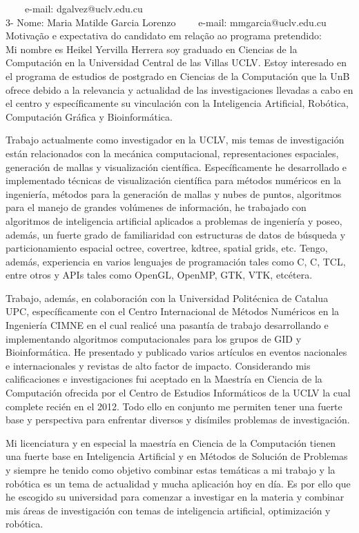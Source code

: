 \documentclass[11pt]{article}
\begin{document}
\ \ \ \ e-mail: dgalvez@uclv.edu.cu
\\
3- Nome: Maria Matilde Garcia Lorenzo
\ \ \ \ e-mail: mmgarcia@uclv.edu.cu
\\[0.2cm]
Motivação e expectativa do candidato em relação ao programa pretendido:
\\Mi nombre es Heikel Yervilla Herrera soy graduado en Ciencias de la Computación en la Universidad Central de las Villas UCLV. Estoy interesado en el programa de estudios de postgrado en Ciencias de la Computación que la UnB ofrece debido a la relevancia y actualidad de las investigaciones llevadas a cabo en el centro y específicamente su vinculación con la Inteligencia Artificial, Robótica, Computación Gráfica y Bioinformática.

Trabajo actualmente como investigador en la UCLV, mis temas de investigación  están relacionados con la mecánica computacional, representaciones espaciales, generación de mallas y visualización científica. Específicamente he desarrollado e implementado técnicas de visualización científica para métodos  numéricos  en la ingeniería, métodos  para la generación de mallas y nubes de puntos, algoritmos para el manejo de grandes volúmenes de información, he trabajado con algoritmos de inteligencia artificial aplicados a problemas de ingeniería y poseo, además, un fuerte grado de familiaridad con estructuras de datos de búsqueda y particionamiento  espacial octree, covertree, kdtree, spatial grids, etc. Tengo, además,  experiencia en varios lenguajes de programación tales como C, C, TCL, entre otros y APIs tales como OpenGL, OpenMP, GTK, VTK, etcétera.

Trabajo, además, en colaboración con la Universidad Politécnica de Catalua  UPC, específicamente con el Centro Internacional de Métodos Numéricos en la Ingeniería CIMNE en el cual realicé una pasantía de trabajo desarrollando e  implementando algoritmos computacionales para los grupos de GID y Bioinformática. He presentado y publicado varios artículos en eventos nacionales e internacionales y revistas de alto factor de impacto.
Considerando mis calificaciones e investigaciones fui aceptado en la Maestría en Ciencia de la Computación ofrecida por el Centro de Estudios Informáticos de la UCLV la cual complete recién en el 2012. Todo ello en conjunto me permiten tener una fuerte base y perspectiva para enfrentar diversos y disímiles problemas de investigación. 

Mi licenciatura y en especial la maestría en Ciencia de la Computación tienen una fuerte base en Inteligencia Artificial y en  Métodos de Solución de Problemas y siempre he tenido como objetivo combinar estas  temáticas a mi trabajo y la robótica es un tema de actualidad y mucha aplicación hoy en día. Es por ello que he escogido su universidad para comenzar a investigar en la  materia y combinar mis  áreas  de investigación con temas de inteligencia  artificial, optimización y robótica.
\end{document}
